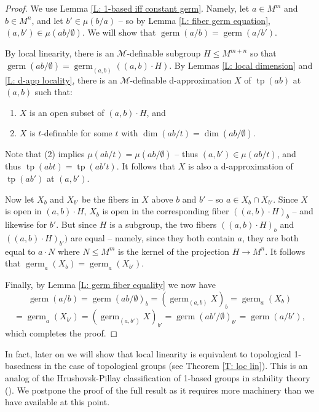 \documentclass{amsart}
\theoremstyle{definition}
\newcommand{\tp}{\operatorname{tp}}
\begin{document}
\begin{proof} We use Lemma \ref{L: 1-based iff constant germ}. Namely, let $a\in M^m$ and $b\in M^n$, and let $b'\in\mu(b/a)$ -- so by Lemma \ref{L: fiber germ equation}, $(a,b')\in\mu(ab/\emptyset)$. We will show that $\operatorname{germ}(a/b)=\operatorname{germ}(a/b')$.

By local linearity, there is an $\mathcal M$-definable subgroup $H\leq M^{m+n}$ so that $\operatorname{germ}(ab/\emptyset)=\operatorname{germ}_{(a,b)}((a,b)\cdot H)$. By Lemmas \ref{L: local dimension} and \ref{L: d-app locality}, there is an $\mathcal M$-definable d-approximation $X$ of $\tp(ab)$ at $(a,b)$ such that:
\begin{enumerate}
    \item $X$ is an open subset of $(a,b)\cdot H$, and
   \item $X$ is $t$-definable for some $t$ with $\dim(ab/t)=\dim(ab/\emptyset)$.
\end{enumerate}

Note that (2) implies $\mu(ab/t)=\mu(ab/\emptyset)$ -- thus $(a,b')\in\mu(ab/t)$, and thus $\tp(abt)=\tp(ab't)$. It follows that $X$ is also a d-approximation of $\tp(ab')$ at $(a,b')$.

Now let $X_b$ and $X_{b'}$ be the fibers in $X$ above $b$ and $b'$ -- so $a\in X_b\cap X_{b'}$. Since $X$ is open in $(a,b)\cdot H$, $X_b$ is open in the corresponding fiber $((a,b)\cdot H)_b$ -- and likewise for $b'$. But since $H$ is a subgroup, the two fibers $((a,b)\cdot H)_b$ and $((a,b)\cdot H)_{b'})$ are equal -- namely, since they both contain $a$, they are both equal to $a\cdot N$ where $N\leq M^m$ is the kernel of the projection $H\rightarrow M^n$. It follows that $\operatorname{germ}_a(X_b)=\operatorname{germ}_a(X_{b'})$.

Finally, by Lemma \ref{L: germ fiber equality} we now have $$\operatorname{germ}(a/b)=\operatorname{germ}(ab/\emptyset)_b=(\operatorname{germ}_{(a,b)}X)_b=\operatorname{germ}_a(X_b)$$ $$=\operatorname{germ}_a(X_{b'})=(\operatorname{germ}_{(a,b')}X)_{b'}=\operatorname{germ}(ab'/\emptyset)_{b'}=\operatorname{germ}(a/b'),$$ which completes the proof.
\end{proof}

In fact, later on we will show that local linearity is equivalent to topological 1-basedness in the case of topological groups (see Theorem \ref{T: loc lin}). This is an analog of the Hrushovsk-Pillay classification of 1-based groups in stability theory (\cite{HrPi87}). We postpone the proof of the full result as it requires more machinery than we have available at this point. 
\end{document}
